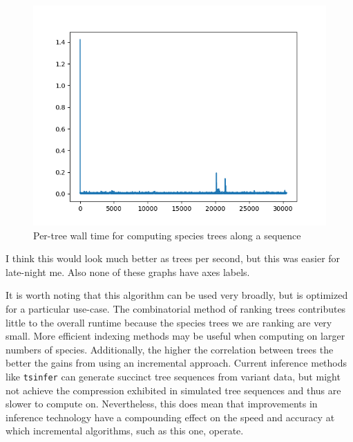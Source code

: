 \documentclass{article}
\newcommand{\tsinfer}{{\texttt{tsinfer}}}
\begin{document}
\begin{figure}[H]
    \includegraphics[scale=0.8]{incremental_times.png}
    \centering
    \caption{Per-tree wall time for computing species trees along a sequence}
    \label{fig:dp_alg}
\end{figure}

I think this would look much better as trees per second, but this was easier
for late-night me. Also none of these graphs have axes labels.

It is worth noting that this algorithm can be used very broadly, but is optimized
for a particular use-case. The combinatorial method of ranking trees contributes
little to the overall runtime because the species trees we are ranking are very
small. More efficient indexing methods may be useful when computing on larger
numbers of species. Additionally, the higher the correlation between trees the
better the gains from using an incremental approach. Current inference methods
like \tsinfer{} can generate succinct tree sequences from variant data, but might
not achieve the compression exhibited in simulated tree sequences and thus
are slower to compute on. Nevertheless, this does mean that improvements in
inference technology have a compounding effect on the speed and accuracy
at which incremental algorithms, such as this one, operate.
\end{document}

